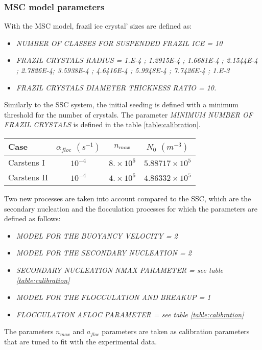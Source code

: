 \subsubsection{MSC model parameters}
With the MSC model, frazil ice crystal' sizes are defined as:
\begin{itemize}
	\item\textit{NUMBER OF CLASSES FOR SUSPENDED FRAZIL ICE = 10}
	\item\textit{FRAZIL CRYSTALS RADIUS = 1.E-4 ; 1.2915E-4 ; 1.6681E-4 ; 2.1544E-4 ; 2.7826E-4;
3.5938E-4 ; 4.6416E-4 ; 5.9948E-4 ; 7.7426E-4 ; 1.E-3}
	\item\textit{FRAZIL CRYSTALS DIAMETER THICKNESS RATIO = 10.}
\end{itemize}

Similarly to the SSC system, the initial seeding is defined 
with a minimum threshold for the number of crystals.
The parameter \textit{MINIMUM NUMBER OF FRAZIL CRYSTALS}
is defined in the table \ref{table:calibration}.

\begin{center}
\begin{tabular}{lccc}
\hline
Case & $\alpha_{floc}$ $(s^{-1})$ & $n_{max}$ & $N_0$ $(m^{-3})$ \\
\hline \hline
Carstens I & $10^{-4}$ & $8. \times 10^{6}$ & $5.88717 \times 10^{5}$  \\
\hline
Carstens II & $10^{-4}$ & $4. \times 10^{6}$ & $4.86332 \times 10^{5}$  \\
\hline
\end{tabular}
\label{table:calibration}
\end{center}

Two new processes are taken into account compared to the SSC, 
which are the secondary nucleation and the flocculation processes for which
the parameters are defined as follows:
\begin{itemize}
	\item\textit{MODEL FOR THE BUOYANCY VELOCITY = 2}
	\item\textit{MODEL FOR THE SECONDARY NUCLEATION = 2}
	\item\textit{SECONDARY NUCLEATION NMAX PARAMETER = see table \ref{table:calibration}}
	\item\textit{MODEL FOR THE FLOCCULATION AND BREAKUP = 1}
	\item\textit{FLOCCULATION AFLOC PARAMETER = see table \ref{table:calibration}}
\end{itemize}
The parameters $n_{max}$ and $a_{floc}$ parameters are taken as calibration parameters 
that are tuned to fit with the experimental data.


